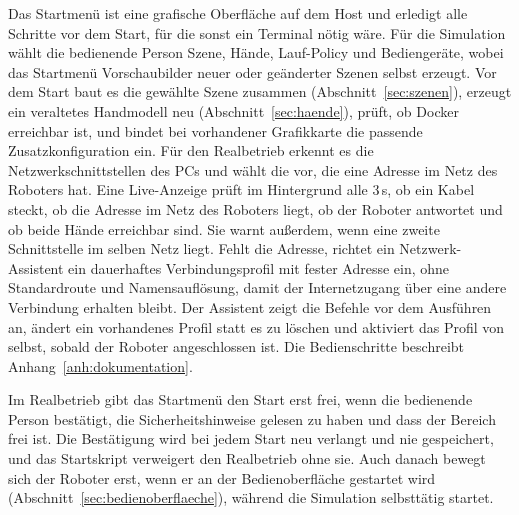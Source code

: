 Das Startmenü ist eine grafische Oberfläche auf dem Host und erledigt alle Schritte vor dem Start, für die sonst ein Terminal nötig wäre.
Für die Simulation wählt die bedienende Person Szene, Hände, Lauf-Policy und Bediengeräte, wobei das Startmenü Vorschaubilder neuer oder geänderter Szenen selbst erzeugt.
Vor dem Start baut es die gewählte Szene zusammen (Abschnitt~\ref{sec:szenen}), erzeugt ein veraltetes Handmodell neu (Abschnitt~\ref{sec:haende}), prüft, ob Docker erreichbar ist, und bindet bei vorhandener Grafikkarte die passende Zusatzkonfiguration ein.
Für den Realbetrieb erkennt es die Netzwerkschnittstellen des PCs und wählt die vor, die eine Adresse im Netz des Roboters hat.
Eine Live-Anzeige prüft im Hintergrund alle 3\,s, ob ein Kabel steckt, ob die Adresse im Netz des Roboters liegt, ob der Roboter antwortet und ob beide Hände erreichbar sind. Sie warnt außerdem, wenn eine zweite Schnittstelle im selben Netz liegt.
Fehlt die Adresse, richtet ein Netzwerk-Assistent ein dauerhaftes Verbindungsprofil mit fester Adresse ein, ohne Standardroute und Namensauflösung, damit der Internetzugang über eine andere Verbindung erhalten bleibt.
Der Assistent zeigt die Befehle vor dem Ausführen an, ändert ein vorhandenes Profil statt es zu löschen und aktiviert das Profil von selbst, sobald der Roboter angeschlossen ist.
Die Bedienschritte beschreibt Anhang~\ref{anh:dokumentation}.

Im Realbetrieb gibt das Startmenü den Start erst frei, wenn die bedienende Person bestätigt, die Sicherheitshinweise gelesen zu haben und dass der Bereich frei ist.
Die Bestätigung wird bei jedem Start neu verlangt und nie gespeichert, und das Startskript verweigert den Realbetrieb ohne sie.
Auch danach bewegt sich der Roboter erst, wenn er an der Bedienoberfläche gestartet wird (Abschnitt~\ref{sec:bedienoberflaeche}), während die Simulation selbsttätig startet.

